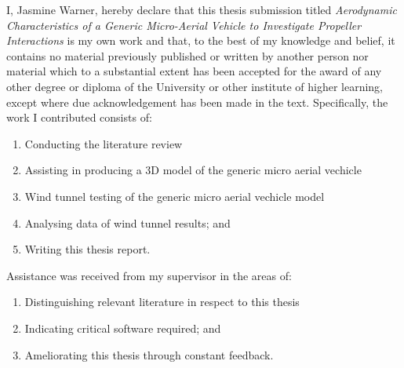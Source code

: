 
\begin{declaration}
I, Jasmine Warner, hereby declare that this thesis submission titled \emph{Aerodynamic Characteristics of a Generic Micro-Aerial Vehicle to Investigate Propeller Interactions} is my own work and that, to the best of my knowledge and belief, it contains no material previously published or written by another person nor material which to a substantial extent has been accepted for the award of any other degree or diploma of the University or other institute of higher learning, except where due acknowledgement has been made in the text.  Specifically, the work I contributed consists of:

\vspace{-1em}

\begin{enumerate}
    \item Conducting the literature review
    \item Assisting in producing a 3D model of the generic micro aerial vechicle
    \item Wind tunnel testing of the generic micro aerial vechicle model
    \item Analysing data of wind tunnel results; and
    \item Writing this thesis report.
\end{enumerate}

\vspace{-1em}

Assistance was received from my supervisor in the areas of:

\vspace{-1em}

\begin{enumerate}
    \item Distinguishing relevant literature in respect to this thesis
    \item Indicating critical software required; and
    \item Ameliorating this thesis through constant feedback.
\end{enumerate}

\vspace{0.5cm}


\end{declaration}
